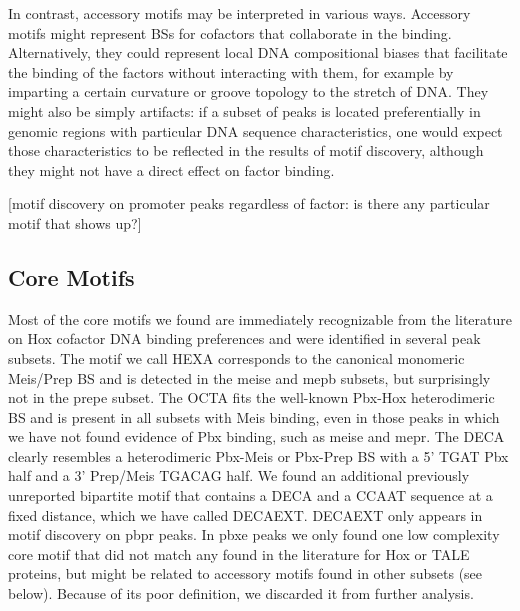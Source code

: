 In contrast, accessory motifs may be interpreted in various ways. Accessory motifs might represent \acp{BS} for cofactors that collaborate in the binding. Alternatively, they could represent local DNA compositional biases that facilitate the binding of the factors without interacting with them, for example by imparting a certain curvature or groove topology to the stretch of DNA. They might also be simply artifacts: if a subset of peaks is located preferentially in genomic regions with particular DNA sequence characteristics, one would expect those characteristics to be reflected in the results of motif discovery, although they might not have a direct effect on factor binding. %

[motif discovery on promoter peaks regardless of factor: is there any particular motif that shows up?]


\subsection{Core Motifs}

Most of the core motifs we found are immediately recognizable from the literature on Hox cofactor DNA binding preferences and were identified in several peak subsets. The motif we call \ac{HEXA} corresponds to the canonical monomeric Meis/Prep \ac{BS} and is detected in the \ac{meise} and \ac{mepb} subsets, but surprisingly not in the \ac{prepe} subset. The \ac{OCTA} fits the well-known Pbx-Hox heterodimeric \ac{BS} and is present in all subsets with Meis binding, even in those peaks in which we have not found evidence of Pbx binding, such as \ac{meise} and \ac{mepr}. The \ac{DECA} clearly resembles a heterodimeric Pbx-Meis or Pbx-Prep \ac{BS} with a 5' TGAT Pbx half and a 3' Prep/Meis TGACAG half. We found an additional previously unreported bipartite motif that contains a \ac{DECA} and a CCAAT sequence at a fixed distance, which we have called \ac{DECAEXT}. \ac{DECAEXT} only appears in motif discovery on \ac{pbpr} peaks. In \ac{pbxe} peaks we only found one low complexity core motif that did not match any found in the literature for Hox or \ac{TALE} proteins, but might be related to accessory motifs found in other subsets (see below). Because of its poor definition, we discarded it from further analysis. %

